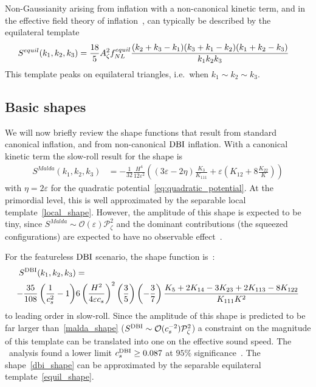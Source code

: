     Non-Gaussianity arising from inflation with a non-canonical kinetic term,
    and in the effective field theory of inflation~\cite{Cheung_eft, Baumann_horizon_2011},
    can typically be described by the equilateral template
\begin{align}\label{equil_shape}
    S^{equil}(k_1,k_2,k_3)
    &= \frac{18}{5}A_\zeta^2f^{equil}_{NL}\frac{(k_2+k_3-k_1)(k_3+k_1-k_2)(k_1+k_2-k_3)}{k_1k_2k_3}
\end{align}
This template peaks on equilateral triangles, i.e.\ when $k_1\sim k_2\sim k_3$.


\subsection{Basic shapes}
    We will now briefly review the shape functions that result from
    standard canonical inflation, and from non-canonical $\text{DBI}$ inflation.
    With a canonical kinetic term
    the slow-roll result for the shape is
\begin{align}\label{malda_shape}
    S^{Malda}(k_1,k_2,k_3) &= -\frac{1}{32}\frac{H^4}{12\varepsilon^2} \left( (3\varepsilon-2\eta)\frac{K_3}{K_{111}}+\varepsilon \left(K_{12}+8\frac{K_{22}}{K}\right) \right)
\end{align}
with $\eta=2\varepsilon$ for the quadratic potential~\eqref{eq:quadratic_potential}.
At the primordial level, this is well approximated by the separable local template~\eqref{local_shape}.
However, the amplitude of this shape is expected to be tiny,
since $S^{Malda}\sim\mathcal{O}(\varepsilon)\mathcal{P}^2_{\zeta}$
and the dominant contributions (the squeezed configurations) are expected
to have no observable effect~\cite{Cabass_2016}.


For the featureless $\text{DBI}$ scenario, the shape function is~\cite{dbi_in_the_sky}:
\begin{align}\label{dbi_shape}
    S^{\text{DBI}}(k_1,k_2,k_3) &=\nonumber\\
    -\frac{35}{108}
         \left(\frac{1}{c_s^2}-1\right)&
         6\left(\frac{H^2}{4\varepsilon c_s}\right)^2
         \left(\frac{3}{5}\right)
         \left(-\frac{3}{7}\right)
         \frac{K_5+2K_{14}-3K_{23}+2K_{113}-8K_{122}}{K_{111}K^2}
\end{align}
to leading order in slow-roll.
Since the amplitude of this shape is predicted to be far larger than~\eqref{malda_shape}
($S^{\text{DBI}}\sim\mathcal{O}(c_s^{-2})\mathcal{P}^2_{\zeta}$)
a constraint on the magnitude of this template can be translated into one 
on the effective sound speed. The \planck~analysis found a lower limit $c_s^{\text{DBI}} \geq 0.087$
at $95\%$ significance~\cite{Planck_NG_2015}.
The shape~\eqref{dbi_shape} can be approximated by the separable equilateral template~\eqref{equil_shape}.


